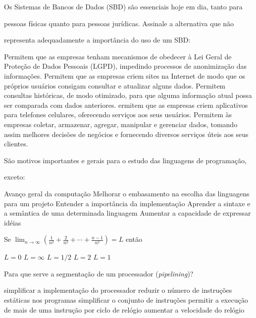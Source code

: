 \documentclass[12pt, addpoints]{exam}
\begin{document}
\begin{questions}
\question

Os Sistemas de Bancos de Dados (SBD) são essenciais hoje em dia, tanto para

pessoas físicas quanto para pessoas jurídicas. Assinale a alternativa que não

representa adequadamente a importância do uso de um SBD:
\begin{choices}
\choice Permitem que as empresas tenham mecanismos de obedecer à Lei Geral de Proteção de Dados Pessoais (LGPD), impedindo processos de anonimização das informações.
\choice Permitem que as empresas criem sites na Internet de modo que os próprios usuários consigam consultar e atualizar alguns dados.
\choice Permitem consultas históricas, de modo otimizado, para que alguma informação atual possa ser comparada com dados anteriores.
\choice ermitem que as empresas criem aplicativos para telefones celulares, oferecendo serviços aos seus usuários.
\choice Permitem às empresas coletar, armazenar, agregar, manipular e gerenciar dados, tomando assim melhores decisões de negócios e fornecendo diversos serviços úteis aos seus clientes.
\end{choices}

\question

São motivos importantes e gerais para o estudo das linguagens de programação,

exceto:
\begin{choices}
\choice Avanço geral da computação
\choice Melhorar o embasamento na escolha das linguagens para um projeto
\choice Entender a importância da implementação
\choice Aprender a sintaxe e a semântica de uma determinada linguagem
\choice Aumentar a capacidade de expressar idéias
\end{choices}

\question

Se \( \lim_{n \to \infty} \left( \frac{1}{n^2} + \frac{2}{n^2} + \cdots + \frac{n-1}{n^2} \right) = L \) então


\begin{choices}
\choice \( L = 0 \)
\choice \( L = \infty \)
\choice \( L = 1/2 \)
\choice \( L = 2 \)
\choice \( L = 1 \)
\end{choices}

\question

Para que serve a segmentação de um processador (\textit{pipelining})?
\begin{choices}
\choice simplificar a implementação do processador
\choice reduzir o número de instruções estáticas nos programas
\choice simplificar o conjunto de instruções
\choice permitir a execução de mais de uma instrução por ciclo de relógio
\choice aumentar a velocidade do relógio
\end{choices}


\end{questions}
\end{document}
